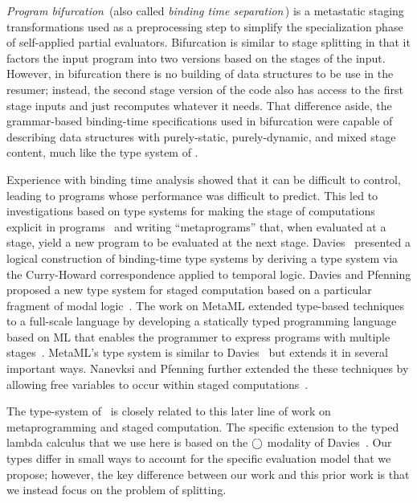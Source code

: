 \emph{Program bifurcation}\,\cite{DeNiel91} (also called \emph{binding time separation}\,\cite{Mogensen89a})
is a metastatic staging transformations
used as a preprocessing step to simplify the specialization phase of self-applied partial evaluators. 
Bifurcation is similar to stage splitting in that it factors the input program
into two versions based on the stages of the input.
However, in bifurcation there is no building of data structures to be use in the resumer;
instead, the second stage version of the code also has 
access to the first stage inputs and just recomputes whatever it needs.
That difference aside, the grammar-based binding-time specifications used in bifurcation
were capable of describing data structures with purely-static, purely-dynamic, and mixed stage content,
much like the type system of \lang.

Experience with binding time analysis showed that it can be difficult
to control, leading to programs whose performance was difficult to
predict. This led to investigations based on type systems for making
the stage of computations explicit in
programs~\cite{GJ91-lambda,NN92-twolevel} and writing ``metaprograms''
that, when evaluated at a stage, yield a new program to be evaluated
at the next stage.
Davies~\cite{davies96} presented a
logical construction of binding-time type systems by deriving a type
system via the Curry-Howard correspondence applied to temporal logic.
Davies and Pfenning proposed a new type system for staged computation
based on a particular fragment of modal logic~\cite{DP01-modal}. The
work on MetaML extended type-based techniques to a full-scale language
by developing a statically typed programming language based on ML that
enables the programmer to express programs with multiple
stages~\cite{Taha97,taha-thesis-99}.  MetaML's type system is similar
to Davies~\cite{davies96} but extends it in several important ways.
Nanevksi and Pfenning further extended the these techniques by
allowing free variables to occur within staged
computations~\cite{NP05-nn}.

The type-system of \lang\ is closely related to this later line of
work on metaprogramming and staged computation.  The specific
extension to the typed lambda calculus that we use here is based on
the $\bigcirc$ modality of Davies~\cite{DP01-modal}.  Our types differ in
small ways to account for the specific evaluation model that we
propose; however, the key difference between our work and this prior
work is that we instead focus on the problem of splitting.

